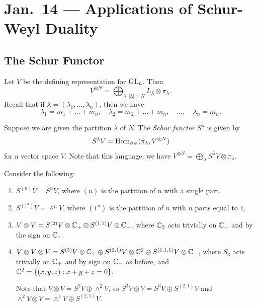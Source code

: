 \chapter{Jan.~14 --- Applications of Schur-Weyl Duality}

\section{The Schur Functor}

\begin{remark}
  Let $V$ be the defining
  representation for $\operatorname{GL}_n$. Then
  \[
    V^{\otimes N}
    = \bigoplus_{\lambda : |\lambda| = N} L_\lambda \otimes \pi_\lambda.
  \]
  Recall that if
  $\lambda = (\lambda_1, \dots, \lambda_n)$, then
  we have
  \[
    \lambda_1 = m_1 + \dots + m_n,
    \quad \lambda_2 = m_2 + \dots + m_n, \quad \dots, \quad
    \lambda_n = m_n.
  \]
\end{remark}

\begin{definition}
  Suppose we are given the
  partition $\lambda$ of $N$.
  The \emph{Schur functor} $S^\lambda$
  is given by
  \[
    S^\lambda V
    = \operatorname{Hom}_{S_N}(\pi_\lambda, V^{\otimes N})
  \]
  for a vector space $V$.
  Note that this language, we have
  $V^{\otimes N} = \bigoplus_\lambda S^\lambda V \otimes \pi_\lambda$.
\end{definition}

\begin{example}
  Consider the following:
  \begin{enumerate}
    \item $S^{(n)} V = S^n V$, where
      $(n)$ is the partition
      of $n$ with a single part.
    \item $S^{(1^n)} V = \wedge^n V$, where
      $(1^n)$ is the partition of $n$
      with $n$ parts equal to $1$.
    \item $V \otimes V = S^{(2)} V \otimes \mathbb{C}_+ \oplus S^{(1, 1)} V \otimes \mathbb{C}_-$,
      where $\mathbb{C}_2$ acts trivially on
      $\mathbb{C}_+$ and
      by the sign on $\mathbb{C}_-$.
    \item $V \otimes V \otimes V = S^{(3)} V \otimes \mathbb{C}_+ \oplus S^{(2, 1)} V \otimes \mathbb{C}^2 \oplus S^{(1, 1, 1)} V \otimes \mathbb{C}_-$,
      where $S_3$ acts trivially
      on $\mathbb{C}_+$ and by sign on
      $\mathbb{C}_-$ as before, and
      $\mathbb{C}^2 = \{(x, y, z) : x + y + z = 0\}$.

      Note that $V \otimes V = S^2 V \oplus \wedge^2 V$, so
      $S^2 V \otimes V = S^3 V \oplus S^{(2, 1)} V$ and
      $\wedge^2 V \otimes V = \wedge^3 V \oplus S^{(2, 1)} V$.
  \end{enumerate}
\end{example}


